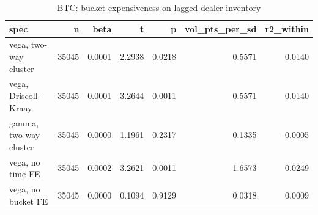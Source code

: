 \begin{table}
\caption{BTC: bucket expensiveness on lagged dealer inventory}
\label{tab:t4_cross_section_BTC}
\begin{tabular}{lrrrrrr}
\toprule
spec & n & beta & t & p & vol\_pts\_per\_sd & r2\_within \\
\midrule
vega, two-way cluster & 35045 & 0.0001 & 2.2938 & 0.0218 & 0.5571 & 0.0140 \\
vega, Driscoll-Kraay & 35045 & 0.0001 & 3.2644 & 0.0011 & 0.5571 & 0.0140 \\
gamma, two-way cluster & 35045 & 0.0000 & 1.1961 & 0.2317 & 0.1335 & -0.0005 \\
vega, no time FE & 35045 & 0.0002 & 3.2621 & 0.0011 & 1.6573 & 0.0249 \\
vega, no bucket FE & 35045 & 0.0000 & 0.1094 & 0.9129 & 0.0318 & 0.0009 \\
\bottomrule
\end{tabular}
\end{table}
